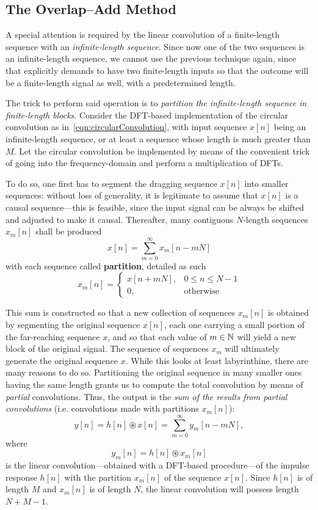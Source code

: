 \documentclass[\documentfontsize, twocolumn]{\classname}
\begin{document}
\subsection{The Overlap--Add Method}

A special attention is required by the linear convolution of a finite-length sequence with an \emph{infinite-length sequence}. Since now one of the two sequences is an infinite-length sequence, we cannot use the previous technique again, since that explicitly demands to have two finite-length inputs so that the outcome will be a finite-length signal as well, with a predetermined length.

The trick to perform said operation is to \emph{partition the infinite-length sequence in finite-length blocks}. Consider the DFT-based implementation of the circular convolution as in~\ref{eqn:circularConvolution}, with input sequence $x[n]$ being an infinite-length sequence, or at least a sequence whose length is much greater than $M$. Let the circular convolution be implemented by means of the convenient trick of going into the frequency-domain and perform a multiplication of DFTs.

To do so, one first has to segment the dragging sequence $x[n]$ into smaller sequences: without loss of generality, it is legitimate to assume that $x[n]$ is a causal sequence---this is feasible, since the input signal can be always be shifted and adjusted to make it causal. Thereafter, many contiguous $N$-length sequences $x_m[n]$ shall be produced
\[
    x[n] = \sum_{m=0}^{\infty} x_m[n - mN]
\]
with each sequence called \textbf{partition}, detailed as such
\[
    x_m[n] =
    \left\{
        \begin{array}{ll}
            x[n + mN], & 0 \leq n \leq N-1\\
            0, & \mbox{otherwise}
        \end{array}
    \right.
\]

This sum is constructed so that a new collection of sequences $x_m[n]$ is obtained by segmenting the original sequence $x[n]$, each one carrying a small portion of the far-reaching sequence $x$, and so that each value of $m \in \mathbb N$ will yield a new block of the original signal. The sequence of sequences $x_m$ will ultimately generate the original sequence $x$. While this looks at least labyrinthine, there are many reasons to do so. Partitioning the original sequence in many smaller ones having the same length grants us to compute the total convolution by means of \emph{partial} convolutions. Thus, the output is the \emph{sum of the results from partial convolutions} (i.e. convolutions made with partitions $x_m[n]$):
\begin{equation}\label{eqn:overlapAddMethod}
    y[n] = h[n] \circledast x[n] = \sum_{m=0}^\infty y_m[n - mN],
\end{equation}
where \[y_m[n] = h[n] \circledast x_m[n]\] is the linear con\-vo\-lu\-tion---ob\-tai\-ned with a DFT-based pro\-ce\-du\-re---of the impulse response $h[n]$ with the partition $x_m[n]$ of the sequence $x[n]$. Since $h[n]$ is of length $M$ and $x_m[n]$ is of length $N$, the linear convolution will possess length $N + M - 1$.
\end{document}
